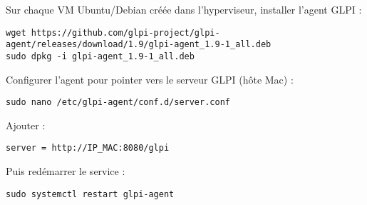 \documentclass[11pt,a4paper]{article}
\begin{document}
\begin{tcolorbox}[title={6. Supervision des VMs avec l’agent GLPI}]
Sur chaque VM Ubuntu/Debian créée dans l’hyperviseur, installer l’agent GLPI :  
\begin{verbatim}
wget https://github.com/glpi-project/glpi-agent/releases/download/1.9/glpi-agent_1.9-1_all.deb
sudo dpkg -i glpi-agent_1.9-1_all.deb
\end{verbatim}

Configurer l’agent pour pointer vers le serveur GLPI (hôte Mac) :  
\begin{verbatim}
sudo nano /etc/glpi-agent/conf.d/server.conf
\end{verbatim}

Ajouter :
\begin{verbatim}
server = http://IP_MAC:8080/glpi
\end{verbatim}

Puis redémarrer le service :
\begin{verbatim}
sudo systemctl restart glpi-agent
\end{verbatim}
\end{tcolorbox}
\end{document}
